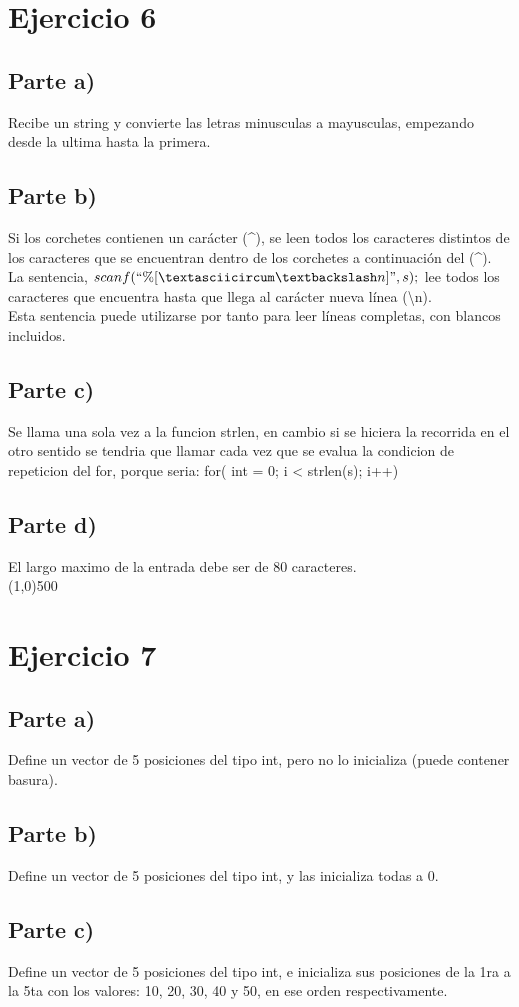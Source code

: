 \documentclass[letterpaper]{report}
\newcommand{\sectionh}[1]{\line(1,0){500}\section*{#1}}
\begin{document}
\section*{Ejercicio 6}
\subsection*{Parte a)}
Recibe un string y convierte las letras minusculas a mayusculas, empezando desde la ultima hasta la primera.
\subsection*{Parte b)}
Si los corchetes contienen un carácter (\textasciicircum), se leen todos los caracteres distintos de los caracteres que se encuentran dentro de los corchetes a continuación del (\textasciicircum). \\
La sentencia, $ scanf(``\%[\textasciicircum \textbackslash n] " , s);$ lee todos los caracteres que encuentra hasta que llega al carácter nueva línea (\textbackslash n). \\
Esta sentencia puede utilizarse por tanto para leer líneas completas, con blancos incluidos.

\subsection*{Parte c)}
Se llama una sola vez a la funcion strlen, en cambio si se hiciera la recorrida en el otro sentido se tendria que llamar cada vez que se evalua la condicion de repeticion del for, porque seria: for( int = 0; i < strlen(s); i++)
\subsection*{Parte d)}
El largo maximo de la entrada debe ser de 80 caracteres.\\
\sectionh{Ejercicio 7}
\subsection*{Parte a)}
Define un vector de 5 posiciones del tipo int, pero no lo inicializa (puede contener basura).
\subsection*{Parte b)}
Define un vector de 5 posiciones del tipo int, y las inicializa todas a 0.
\subsection*{Parte c)}
Define un vector de 5 posiciones del tipo int, e inicializa sus posiciones de la 1ra a la 5ta con los valores: 10, 20, 30, 40 y 50, en ese orden respectivamente.
\end{document}
